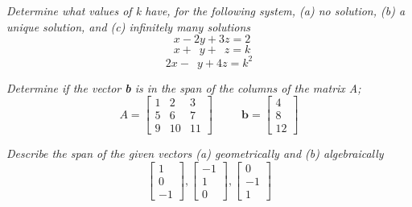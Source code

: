 \documentclass[12pt,letterpaper]{hmcpset}
\begin{document}
\begin{solution}

\end{solution}

\newpage

\begin{problem}[2.2.42]
\textit{Determine what values of k have, for the following system, (a) no solution, (b) a unique solution, and (c) infinitely many solutions}
$$ \phantom2 x - 2y+3z=2$$
$$ \phantom2 x +\phantom 2 y+\phantom3z = k$$
$$ 2x - \phantom2 y +4z= k^2$$ 
\end{problem}

\begin{solution}

\end{solution}

\newpage

\begin{problem}[2.3.8]
\textit{Determine if the vector \textbf{b} is in the span of the columns of the matrix A;}
$$ A = \begin{bmatrix}
1&2&3\\5&6&7\\9&10&11
\end{bmatrix}
\phantom{asdas}
\textbf{b}= \begin{bmatrix}
4\\8\\12
\end{bmatrix}
$$
\end{problem}

\begin{solution}

\end{solution}

\newpage

\begin{problem}[2.3.16]
\textit{Describe the span of the given vectors (a) geometrically  and (b) algebraically}
$$ \begin{bmatrix}
1\\0\\-1
\end{bmatrix} \phantom{	},
\begin{bmatrix}
-1\\1\\0
\end{bmatrix} \phantom{	},
\begin{bmatrix}
0\\-1\\1
\end{bmatrix} \phantom{	}
$$
\end{problem}
\end{document}
